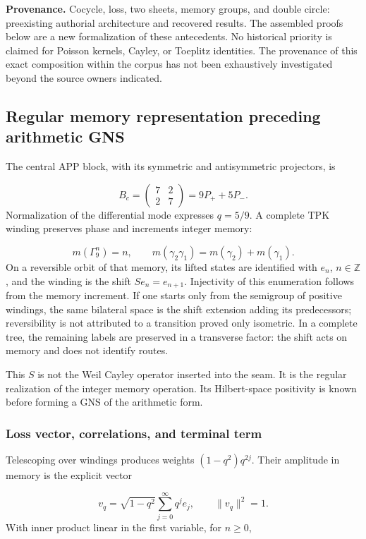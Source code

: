 \textbf{Provenance.} Cocycle, loss, two sheets, memory groups, and double circle: preexisting authorial architecture and recovered results. The assembled proofs below are a new formalization of these antecedents. No historical priority is claimed for Poisson kernels, Cayley, or Toeplitz identities. The provenance of this exact composition within the corpus has not been exhaustively investigated beyond the source owners indicated.


\subsection{Regular memory representation preceding arithmetic GNS}
\label{tm-add-m2}
The central APP block, with its symmetric and antisymmetric projectors, is

\[
B_c=\begin{pmatrix}7&2\\2&7\end{pmatrix}
=9P_++5P_-.
\]
Normalization of the differential mode expresses \(q=5/9\). A complete TPK winding preserves phase and increments integer memory:

\[
m(\Gamma_9^n)=n,\qquad
m(\gamma_2\gamma_1)=m(\gamma_2)+m(\gamma_1).
\]
On a reversible orbit of that memory, its lifted states are identified with \(e_n\), \(n\in\mathbb Z\), and the winding is the shift \(Se_n=e_{n+1}\). Injectivity of this enumeration follows from the memory increment. If one starts only from the semigroup of positive windings, the same bilateral space is the shift extension adding its predecessors; reversibility is not attributed to a transition proved only isometric. In a complete tree, the remaining labels are preserved in a transverse factor: the shift acts on memory and does not identify routes.

This \(S\) is not the Weil Cayley operator inserted into the seam. It is the regular realization of the integer memory operation. Its Hilbert-space positivity is known before forming a GNS of the arithmetic form.


\subsubsection{Loss vector, correlations, and terminal term}
\label{tm-add-m2-1}
Telescoping over windings produces weights \((1-q^2)q^{2j}\). Their amplitude in memory is the explicit vector

\[
v_q=\sqrt{1-q^2}\sum_{j=0}^{\infty}q^j e_j,
\qquad \|v_q\|^2=1.
\]
With inner product linear in the first variable, for \(n\ge0\),

